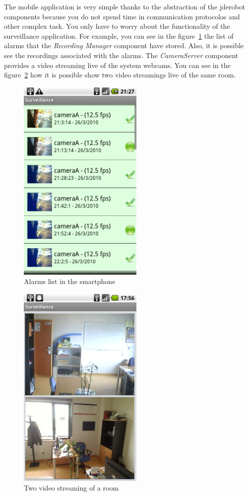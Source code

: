 \documentclass[twocolumn]{svjour3}          %
\begin{document}
The mobile application is very simple thanks to the abstraction of the
jderobot components because you do not spend time in communication
protocolos and other complex task. You only have to worry about the
functionality of the surveillance application. For example, you can
see in the figure~\ref{fig:surveillance2} the list of alarms that the
\emph{Recording Manager} component have stored. Also, it is possible
see the recordings associated with the alarms. The \emph{CameraServer}
component provides a video streaming live of the system webcams. You
can see in the figure~\ref{fig:surveillance3} how it is possible show
two video streamings live of the same room.

\begin{figure}
\includegraphics[width=6cm]{figs/surveillance-android.png}
\caption{Alarms list in the smartphone}
\label{fig:surveillance2}
\end{figure}

\begin{figure}
\includegraphics[width=6cm]{figs/surveillance-streaming2-recording.png}
\caption{Two video streaming of a room}
\label{fig:surveillance3}
\end{figure}
\end{document}

